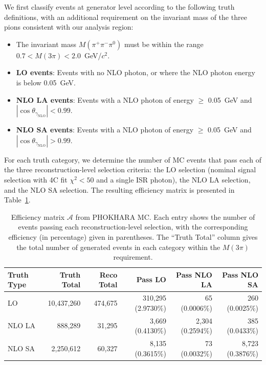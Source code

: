 We first classify events at generator level according to the following truth definitions, with an additional requirement on the invariant mass of the three pions consistent with our analysis region:
\begin{itemize}
    \item The invariant mass $M(\pi^+\pi^-\pi^0)$ must be within the range $0.7 < M(3\pi) < 2.0$~GeV/$c^2$.
    \item \textbf{LO events}: Events with no NLO photon, or where the NLO photon energy is below 0.05~GeV.
    \item \textbf{NLO LA events}: Events with a NLO photon of energy $\ge$ 0.05~GeV and $|\cos\theta_{\gamma_{\text{NLO}}}| < 0.99$.
    \item \textbf{NLO SA events}: Events with a NLO photon of energy $\ge$ 0.05~GeV and $|\cos\theta_{\gamma_{\text{NLO}}}| > 0.99$.
\end{itemize}

For each truth category, we determine the number of MC events that pass each of the three reconstruction-level selection criteria: the LO selection (nominal signal selection with 4C fit $\chi^2 < 50$ and a single ISR photon), the NLO LA selection, and the NLO SA selection. The resulting efficiency matrix is presented in Table~\ref{tab:efficiency_matrix}.

\begin{table}[htbp]
    \centering
    \caption{Efficiency matrix $\mathcal{A}$ from PHOKHARA MC. Each entry shows the number of events passing each reconstruction-level selection, with the corresponding efficiency (in percentage) given in parentheses. The ``Truth Total'' column gives the total number of generated events in each category within the $M(3\pi)$ requirement.}
    \vspace{4mm}
    \begin{tabular}{lrrrrr}
        \hline
        Truth Type & Truth Total & Reco Total & Pass LO & Pass NLO LA & Pass NLO SA \\
        \hline
        LO     & 10,437,260 & 474,675 & 310,295 (2.9730\%) & 65 (0.0006\%) & 260 (0.0025\%) \\
        NLO LA & 888,289    & 31,295  & 3,669 (0.4130\%)  & 2,304 (0.2594\%) & 385 (0.0433\%) \\
        NLO SA & 2,250,612  & 60,327  & 8,135 (0.3615\%)  & 73 (0.0032\%) & 8,723 (0.3876\%) \\
        \hline
    \end{tabular}
    \label{tab:efficiency_matrix}
\end{table}

